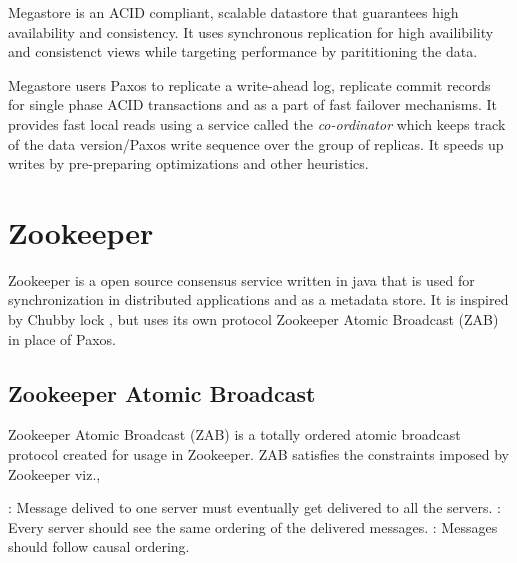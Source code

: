 Megastore \citep{BakerBCFKLLLLY11} is an ACID%
compliant, scalable datastore that guarantees high availability and
consistency. It uses synchronous replication for high availibility and
consistenct views while targeting performance by parititioning the data.

Megastore users Paxos to replicate a write-ahead log, replicate commit
records for single phase ACID transactions and as a part of fast failover
mechanisms. It provides fast local reads using a service called the
\emph{co-ordinator} which keeps track of the data version/Paxos write
sequence over the group of replicas. It speeds up writes by pre-preparing
optimizations and other heuristics.

\section{Zookeeper}
\label{section:zookeeper}

Zookeeper \citep{Hunt:2010:ZWC:1855840.1855851, zookeeper} is a open source 
consensus service written in java that is used for synchronization in 
distributed applications and as a metadata store. It is inspired by Chubby lock 
, but uses its own protocol Zookeeper Atomic Broadcast 
(ZAB) in place of Paxos.

\subsection{Zookeeper Atomic Broadcast}

Zookeeper Atomic Broadcast (ZAB) 
\citep{Reed:2008:STO:1529974.1529978, JunqueiraRS11} is a 
totally ordered atomic broadcast protocol created for usage in Zookeeper. ZAB
satisfies the constraints imposed by Zookeeper viz.,

\begin{itemize}
    : Message delived to one server must eventually
    get delivered to all the servers.
    : Every server should see the same ordering of the 
    delivered messages.
    : Messages should follow causal%
    ordering.
\end{itemize}

